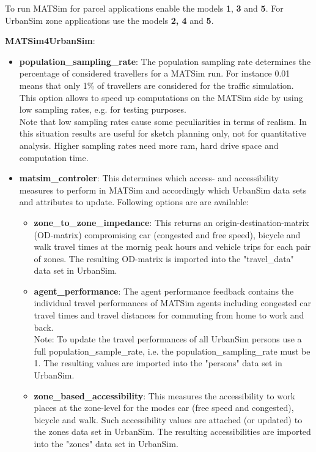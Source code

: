 To run MATSim for parcel applications enable the models \textbf{1},\textbf{ 3} and \textbf{5}. For UrbanSim zone applications use the models \textbf{2, 4} and \textbf{5}.

\textbf{MATSim4UrbanSim}:
\begin{itemize}
	\item \textbf{population\_sampling\_rate}: The population  sampling rate determines the percentage of considered travellers for a  MATSim run. For instance 0.01 means that only 1\% of travellers are  considered for the traffic simulation. This option allows to speed up  computations on the MATSim side by using low sampling rates, e.g. for  testing purposes.
\\   Note that low sampling rates cause some peculiarities in terms of  realism. In this situation results are useful for sketch planning only,  not for quantitative analysis. Higher sampling rates need more ram, hard  drive space and computation time.
	\item \textbf{matsim\_controler}: This determines which access-  and accessibility measures to perform in MATSim and accordingly which  UrbanSim data sets and attributes to update. Following options are are  available:   
\begin{itemize}
	\item \textbf{zone\_to\_zone\_impedance}: This returns an  origin-destination-matrix (OD-matrix) compromising car (congested and  free speed), bicycle and walk travel times at the mornig peak hours and  vehicle trips for each pair of zones. The resulting OD-matrix is  imported into the "travel\_data" data set in UrbanSim.
	\item \textbf{agent\_performance}: The agent performance  feedback contains the individual travel performances of MATSim agents  including congested car travel times and travel distances for commuting  from home to work and back.
\\     Note: To update the travel performances of all UrbanSim persons use a  full population\_sample\_rate, i.e. the population\_sampling\_rate must be  1. The resulting values are imported into the "persons" data set in  UrbanSim.
	\item \textbf{zone\_based\_accessibility}: This measures the  accessibility to work places at the zone-level for the modes car (free  speed and congested), bicycle and walk. Such accessibility values are  attached (or updated) to the zones data set in UrbanSim. The resulting  accessibilities are imported into the "zones" data set in UrbanSim.

\end{itemize}
\end{itemize}

